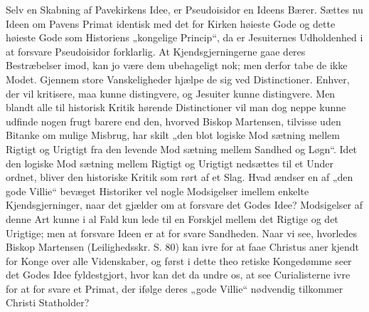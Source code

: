\documentclass[12pt]{book}
\newcommand{\opage}[1]{\marginnote{\footnotesize\textit{[#1]}}}
\begin{document}
Selv en Skabning af Pavekirkens Idee, er Pseudoisidor
en Ideens Bærer. Sættes nu Ideen om Pavens Primat
identisk med det for Kirken høieste Gode og dette høieste
Gode som Historiens „kongelige Princip“, da er Jesuiternes
Udholdenhed i at forsvare Pseudoisidor forklarlig. At
Kjendsgjerningerne gaae deres Bestræbelser imod, kan jo
være dem ubehageligt nok; men derfor tabe de ikke Modet.
\opage{44}\setcounter{footnote}{0}%
Gjennem store Vanskeligheder hjælpe de sig ved Distinctioner.
Enhver, der vil kritisere, maa kunne distingvere, og Jesuiter
kunne distingvere. Men blandt alle til historisk Kritik hørende
Distinctioner vil man dog neppe kunne udfinde nogen frugt\-%
barere end den, hvorved Biskop Martensen, tilvisse uden
Bitanke om mulige Misbrug, har skilt „den blot logiske Mod\-%
sætning mellem Rigtigt og Urigtigt fra den levende Mod\-%
sætning mellem Sandhed og Løgn“. Idet den logiske Mod\-%
sætning mellem Rigtigt og Urigtigt nedsættes til et Under\-%
ordnet, bliver den historiske Kritik som rørt af et Slag.
Hvad ændser en af „den gode Villie“ bevæget Historiker vel
nogle Modsigelser imellem enkelte Kjendsgjerninger, naar det
gjælder om at forsvare det Godes Idee? Modsigelser af
denne Art kunne i al Fald kun lede til en Forskjel mellem
det Rigtige og det Urigtige; men at forsvare Ideen er at for\-%
svare Sandheden. Naar vi see, hvorledes Biskop Martensen
(Leilighedsskr. S. 80) kan ivre for at faae Christus aner\-%
kjendt for Konge over alle Videnskaber, og først i dette theo\-%
retiske Kongedømme seer det Godes Idee fyldestgjort, hvor
kan det da undre os, at see Curialisterne ivre for at for\-%
svare et Primat, der ifølge deres „gode Villie“ nødvendig
tilkommer Christi Statholder?
\end{document}
